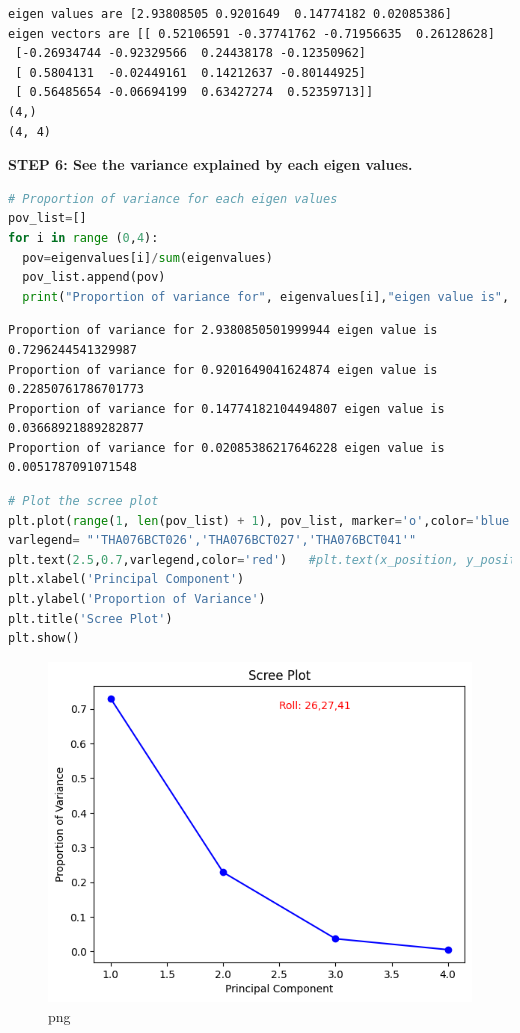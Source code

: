 \documentclass[
]{article}
\begin{document}
\begin{lstlisting}
eigen values are [2.93808505 0.9201649  0.14774182 0.02085386]
eigen vectors are [[ 0.52106591 -0.37741762 -0.71956635  0.26128628]
 [-0.26934744 -0.92329566  0.24438178 -0.12350962]
 [ 0.5804131  -0.02449161  0.14212637 -0.80144925]
 [ 0.56485654 -0.06694199  0.63427274  0.52359713]]
(4,)
(4, 4)
\end{lstlisting}

\textbf{STEP 6: See the variance explained by each eigen values.}

\begin{lstlisting}[language=Python]
# Proportion of variance for each eigen values
pov_list=[]
for i in range (0,4):
  pov=eigenvalues[i]/sum(eigenvalues)
  pov_list.append(pov)
  print("Proportion of variance for", eigenvalues[i],"eigen value is", pov)
\end{lstlisting}

\begin{lstlisting}
Proportion of variance for 2.9380850501999944 eigen value is 0.7296244541329987
Proportion of variance for 0.9201649041624874 eigen value is 0.22850761786701773
Proportion of variance for 0.14774182104494807 eigen value is 0.03668921889282877
Proportion of variance for 0.02085386217646228 eigen value is 0.0051787091071548
\end{lstlisting}

\begin{lstlisting}[language=Python]
# Plot the scree plot
plt.plot(range(1, len(pov_list) + 1), pov_list, marker='o',color='blue')
varlegend= "'THA076BCT026','THA076BCT027','THA076BCT041'"
plt.text(2.5,0.7,varlegend,color='red')   #plt.text(x_position, y_position, varlegend)
plt.xlabel('Principal Component')
plt.ylabel('Proportion of Variance')
plt.title('Scree Plot')
plt.show()
\end{lstlisting}

\begin{figure}
\centering
\includegraphics{PCA on IRIS_files/PCA on IRIS_27_0.png}
\caption{png}
\end{figure}
\end{document}
